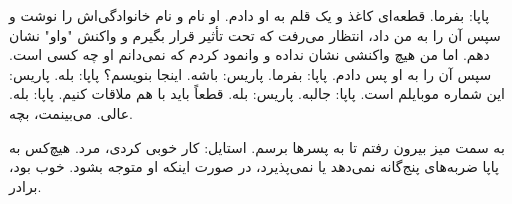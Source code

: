 پاپا: بفرما.  
قطعه‌ای کاغذ و یک قلم به او دادم. او نام و نام خانوادگی‌اش را  
نوشت و سپس آن را به من داد، انتظار می‌رفت که تحت تأثیر قرار بگیرم  
و واکنش "واو" نشان دهم. اما من هیچ واکنشی نشان نداده و وانمود کردم  
که نمی‌دانم او چه کسی است. سپس آن را به او پس دادم.  
پاپا: بفرما.  
پاریس: باشه. اینجا بنویسم؟  
پاپا: بله.  
پاریس: این شماره موبایلم است.  
پاپا: جالبه.  
پاریس: بله. قطعاً باید با هم ملاقات کنیم.  
پاپا: بله. عالی. می‌بینمت، بچه.  

به سمت میز بیرون رفتم تا به پسرها برسم.  
استایل: کار خوبی کردی، مرد. هیچ‌کس به پاپا ضربه‌های پنج‌گانه نمی‌دهد یا  
نمی‌پذیرد، در صورت اینکه او متوجه بشود. خوب بود، برادر.